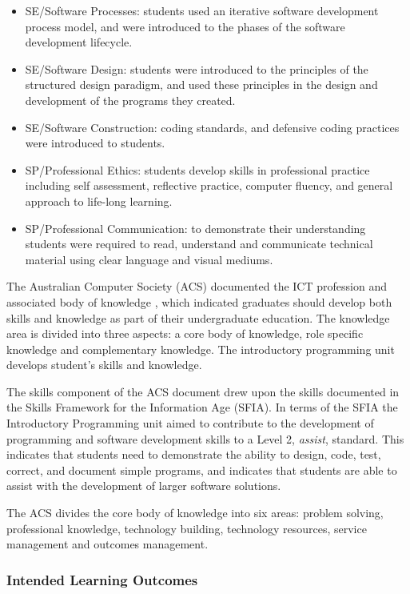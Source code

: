 \begin{itemize}[noitemsep,nolistsep]
	\item SE/Software Processes: students used an iterative software development process model, and were introduced to the phases of the software development lifecycle. 
	\item SE/Software Design: students were introduced to the principles of the structured design paradigm, and used these principles in the design and development of the programs they created.
	\item SE/Software Construction: coding standards, and defensive coding practices were introduced to students.
	\item SP/Professional Ethics: students develop skills in professional practice including self assessment, reflective practice, computer fluency, and general approach to life-long learning.
	\item SP/Professional Communication: to demonstrate their understanding students were required to read, understand and communicate technical material using clear language and visual mediums.
\end{itemize}

The Australian Computer Society (ACS) documented the ICT profession and associated body of knowledge \cite{Gregor:2008}, which indicated graduates should develop both skills and knowledge as part of their undergraduate education. The knowledge area is divided into three aspects: a core body of knowledge, role specific knowledge and complementary knowledge. The introductory programming unit develops student's skills and knowledge.

The skills component of the ACS document drew upon the skills documented in the Skills Framework for the Information Age (SFIA). In terms of the SFIA \cite{SFIA:2011} the Introductory Programming unit aimed to contribute to the development of programming and software development skills to a Level 2, \emph{assist}, standard. This indicates that students need to demonstrate the ability to design, code, test, correct, and document simple programs, and indicates that students are able to assist with the development of larger software solutions.

The ACS divides the core body of knowledge into six areas: problem solving, professional knowledge, technology building, technology resources, service management and outcomes management.


\subsubsection{Intended Learning Outcomes} %
\label{ssub:intended_learning_outcomes}

